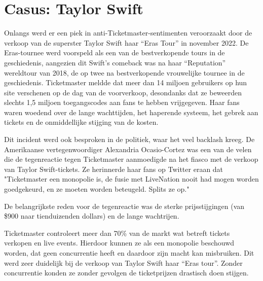 
\section{Casus: Taylor Swift}
\label{sec:Hoofdstuk_3}


Onlangs werd er een piek in anti-Ticketmaster-sentimenten veroorzaakt door de verkoop van de superster Taylor Swift haar “Eras Tour” in november 2022. 
De Eras-tournee werd voorspeld als een van de bestverkopende tours in de geschiedenis, aangezien dit Swift's comeback was na haar “Reputation” wereldtour van 2018, de op twee na bestverkopende vrouwelijke tournee in de geschiedenis.
Ticketmaster meldde dat meer dan 14 miljoen gebruikers op hun site verschenen op de dag van de voorverkoop, desondanks dat ze beweerden slechts 1,5 miljoen toegangscodes aan fans te hebben vrijgegeven. 
Haar fans waren woedend over de lange wachttijden, het haperende systeem, het gebrek aan tickets en de onmiddellijke stijging van de kosten.


Dit incident werd ook besproken in de politiek, waar het veel backlash kreeg.
De Amerikaanse vertegenwoordiger Alexandria Ocasio-Cortez was een van de velen die de tegenreactie tegen Ticketmaster aanmoedigde na het fiasco met de verkoop van Taylor Swift-tickets. Ze herinnerde haar fans op Twitter eraan dat "Ticketmaster een monopolie is, de fusie met LiveNation nooit had mogen worden goedgekeurd, en ze moeten worden beteugeld. Splits ze op."

De belangrijkste reden voor de tegenreactie was de sterke prijsstijgingen (van \$900 naar tienduizenden dollars) en de lange wachtrijen.


Ticketmaster controleert meer dan 70\% van de markt wat betreft tickets verkopen en live events.
Hierdoor kunnen ze als een monopolie beschouwd worden, dat geen concurrentie heeft en daardoor zijn macht kan misbruiken. Dit werd zeer duidelijk bij de verkoop van Taylor Swift haar “Eras tour”. Zonder concurrentie konden ze zonder gevolgen de ticketprijzen drastisch doen stijgen. 

